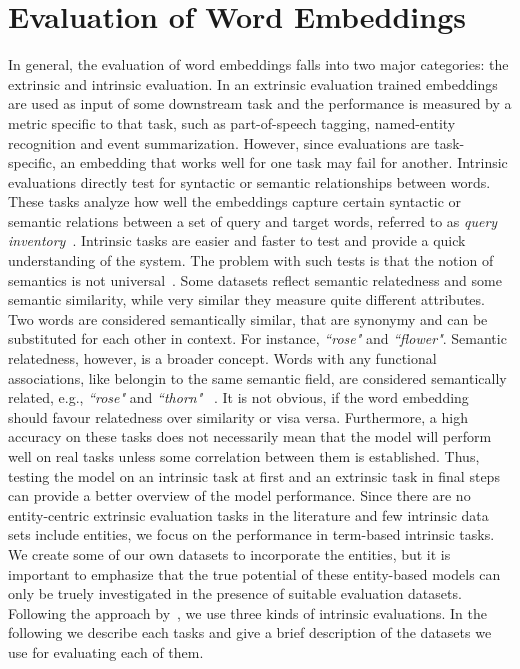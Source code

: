 \section{Evaluation of Word Embeddings}\label{sec:eval_embeddings}
In general, the evaluation of word embeddings falls into two major categories: the extrinsic and intrinsic evaluation. In an extrinsic evaluation trained embeddings are used as input of some downstream task and the performance is measured by a metric specific to that task, such as part-of-speech tagging, named-entity recognition and event summarization. However, since evaluations are task-specific, an embedding that works well for one task may fail for another. Intrinsic evaluations directly test for syntactic or semantic relationships between words. These tasks analyze how well the embeddings capture certain syntactic or semantic relations between a set of query and target words, referred to as \textit{query inventory}~. Intrinsic tasks are easier and faster to test and provide a quick understanding of the system. The problem with such tests is that the notion of semantics is not universal~. Some datasets reflect semantic relatedness and some semantic similarity, while very similar they measure quite different attributes. Two words are considered semantically similar, that are synonymy and can be substituted for each other in context. For instance, \emph{``rose"} and \emph{``flower"}. Semantic relatedness, however, is a broader concept. Words with any functional associations, like belongin to the same semantic field, are considered semantically related, e.g., \emph{``rose"} and \emph{``thorn"} ~. It is not obvious, if the word embedding should favour relatedness over similarity or visa versa. Furthermore, a high accuracy on these tasks does not necessarily mean that the model will perform well on real tasks unless some correlation between them is established. Thus, testing the model on an intrinsic task at first and an extrinsic task in final steps can provide a better overview of the model performance. Since there are no entity-centric extrinsic evaluation tasks in the literature and few intrinsic data sets include entities, we focus on the performance in term-based intrinsic tasks. We create some of our own datasets to incorporate the entities, but it is important to emphasize that the true potential of these entity-based models can only be truely investigated in the presence of suitable evaluation datasets. Following the approach by~, we use three kinds of intrinsic evaluations. In the following we describe each tasks and give a brief description of the datasets we use for evaluating each of them. 
